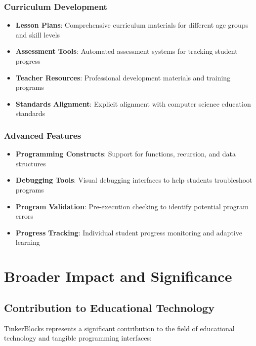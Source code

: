\subsubsection{Curriculum Development}
\begin{itemize}
    \item \textbf{Lesson Plans}: Comprehensive curriculum materials for different age groups and skill levels
    \item \textbf{Assessment Tools}: Automated assessment systems for tracking student progress
    \item \textbf{Teacher Resources}: Professional development materials and training programs
    \item \textbf{Standards Alignment}: Explicit alignment with computer science education standards
\end{itemize}

\subsubsection{Advanced Features}
\begin{itemize}
    \item \textbf{Programming Constructs}: Support for functions, recursion, and data structures
    \item \textbf{Debugging Tools}: Visual debugging interfaces to help students troubleshoot programs
    \item \textbf{Program Validation}: Pre-execution checking to identify potential program errors
    \item \textbf{Progress Tracking}: Individual student progress monitoring and adaptive learning
\end{itemize}

\section{Broader Impact and Significance}

\subsection{Contribution to Educational Technology}

TinkerBlocks represents a significant contribution to the field of educational technology and tangible programming interfaces:

